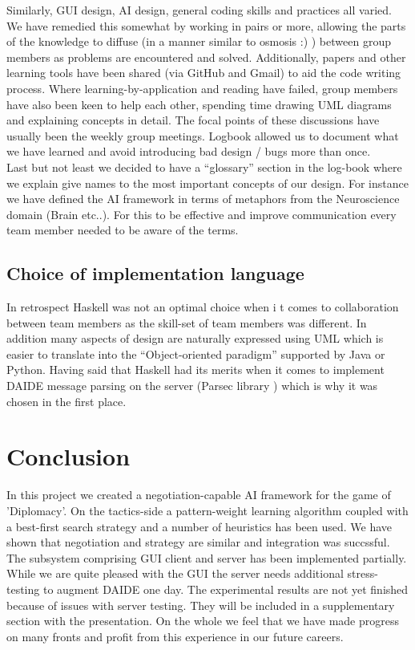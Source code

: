 \documentclass[pdftex,11pt,a4paper]{report}
\begin{document}
Similarly, GUI design, AI design, general coding skills and practices
all varied. We have remedied this somewhat by working in pairs or
more, allowing the parts of the knowledge to diffuse (in a manner
similar to osmosis :) ) between group members as problems are
encountered and solved. Additionally, papers and other learning tools
have been shared (via GitHub and Gmail) to aid the code writing
process. Where learning-by-application and reading have failed, group
members have also been keen to help each other, spending time drawing
UML diagrams and explaining concepts in detail. The focal points of
these discussions have usually been the weekly group meetings. Logbook
allowed us to document what we have learned and avoid introducing bad
design / bugs more than once.  \\ Last but not least we decided to
have a ``glossary'' section in the log-book where we explain give
names to the most important concepts of our design. For instance we
have defined the AI framework in terms of metaphors from the
Neuroscience domain (Brain etc..). For this to be effective and
improve communication every team member needed to be aware of the
terms.


\subsection{Choice of implementation language}
In retrospect Haskell was not an optimal choice when i t comes to
collaboration between team members as the skill-set of team members
was different. In addition many aspects of design are naturally
expressed using UML which is easier to translate into the
``Object-oriented paradigm'' supported by Java or Python.
Having said that Haskell had its merits when it comes to implement
DAIDE message parsing on the server (Parsec library \cite{ParsecLib}) 
which is why it was chosen in the first place.

\pagebreak

\section{Conclusion}

In this project we created a negotiation-capable AI framework for the
game of 'Diplomacy'. On the tactics-side a pattern-weight learning
algorithm \cite{Shapiro02} coupled with a best-first search strategy
and a number of heuristics has been used. We have shown that negotiation
and strategy are similar and integration was succssful. The
subsystem comprising GUI client and server has been implemented partially.
While we are quite pleased with the GUI the server needs additional 
stress-testing to augment DAIDE one day. The experimental results 
are not yet finished because of issues with server testing. They will 
be included in a supplementary section with the presentation.
On the whole we feel that we have made progress on many fronts and
profit from this experience in our future careers. 
\end{document}
